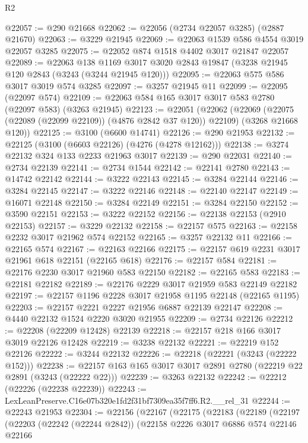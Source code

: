 \begin{lexlean}{R2}
\begin{coremodule}
@22057 := @290 @21668
@22062 := @22056 (@2734 @22057 @3285) (@2887 @21670)
@22063 := @3229 @21945
@22069 := @22063 @1539 @586 @4554 @3019 @22057 @3285
@22075 := @22052 @874 @1518 @4402 @3017 @21847 @22057
@22089 := @22063
    @138
    @1169
    @3017
    @3020
    @2843
    @19847
    (@3238 @21945 @120 @2843 (@3243 (@3244 @21945 @120)))
@22095 := @22063 @575 @586 @3017 @3019 @574 @3285
@22097 := @3257 @21945 @11
@22099 := @22095 (@22097 @574)
@22109 := @22063 @584 @165 @3017 @3017 @583 @2780 (@22097 @583) (@3263 @21945)
@22123 := @22051
    (@22062
      (@22069 (@22075 (@22089 (@22099 @22109)) (@4876 @2842 @37 @120)) @22109)
      (@3268 @21668 @120))
@22125 := @3100 (@6600 @14741)
@22126 := @290 @21953
@22132 := @22125 (@3100 (@6603 @22126) (@4276 (@4278 @12162)))
@22138 := @3274 @22132 @324 @133 @2233 @21963 @3017
@22139 := @290 @22031
@22140 := @2734 @22139
@22141 := @2734 @1544
@22142 := @22141 @2780
@22143 := @14742 @22142
@22144 := @3222 @22143
@22145 := @3284 @22144
@22146 := @3284 @22145
@22147 := @3222 @22146
@22148 := @22140 @22147
@22149 := @16071 @22148
@22150 := @3284 @22149
@22151 := @3284 @22150
@22152 := @3590 @22151
@22153 := @3222 @22152
@22156 := @22138 @22153 (@2910 @22153)
@22157 := @3229 @22132
@22158 := @22157 @575
@22163 := @22158 @2232 @3017 @21962 @574 @22152
@22165 := @3257 @22132 @11
@22166 := @22165 @574
@22167 := @22163 @22166
@22175 := @22157 @619 @2231 @3017 @21961 @618 @22151 (@22165 @618)
@22176 := @22157 @584
@22181 := @22176 @2230 @3017 @21960 @583 @22150
@22182 := @22165 @583
@22183 := @22181 @22182
@22189 := @22176 @2229 @3017 @21959 @583 @22149 @22182
@22197 := @22157 @1196 @2228 @3017 @21958 @1195 @22148 (@22165 @1195)
@22203 := @22157 @2221 @2227 @21956 @6887 @22139 @22147
@22208 := @4440 @22132 @1524 @2220 @3020 @21955
@22209 := @2734 @22126
@22212 := @22208 (@22209 @12428) @22139
@22218 := @22157 @218 @166 @3017 @3019 @22126 @12428
@22219 := @3238 @22132
@22221 := @22219 @152 @22126
@22222 := @3244 @22132
@22226 := @22218 (@22221 (@3243 (@22222 @152)))
@22238 := @22157 @163 @165 @3017 @3017 @2891 @2780 (@22219 @22 @2891 (@3243 (@22222 @22)))
@22239 := @3263 @22132
@22242 := @22212 (@22226 (@22238 @22239))
@22243 := LexLeanPreserve.C16e07b320e1fd2f31bf7309ea35f7ff6.R2.__rel_31
@22244 := @22243 @21953
@22304 := @22156
    (@22167
      (@22175
        (@22183
          (@22189
            (@22197
              (@22203
                (@22242 (@22244 @2842))
                (@22158
                  @2226
                  @3017
                  @6886
                  @574
                  @22146
                  @22166

\end{coremodule}
\end{lexlean}
